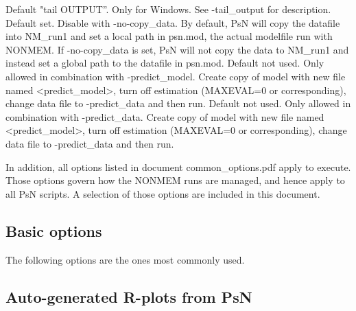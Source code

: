 \begin{optionlist}
\nextopt
{}
Default "tail OUTPUT”. Only for Windows. See -tail\_output for description.
\nextopt
{}
Default set. Disable with -no-copy\_data. By default, PsN will copy the datafile into NM\_run1 and set a local path in psn.mod, the actual modelfile run with NONMEM. If -no-copy\_data is set, PsN will not copy the data to NM\_run1 and instead set a global path to the datafile in psn.mod.
\nextopt
{}
Default not used. 
Only allowed in combination with -predict\_model.
Create copy of model with new file named <predict\_model>, turn off estimation 
(MAXEVAL=0 or corresponding), change data file to -predict\_data and then run.
Default not used. 
Only allowed in combination with -predict\_data.
Create copy of model with new file named <predict\_model>, turn off estimation 
(MAXEVAL=0 or corresponding), change data file to -predict\_data and then run.
\nextopt
\end{optionlist}

In addition, all options listed in document common\_options.pdf apply to 
execute. 
Those options govern how the NONMEM runs are managed, and hence apply to all PsN scripts. A selection of those options are included in this document.

\subsection{Basic options}
The following options are the ones most commonly used.


\subsection{Auto-generated R-plots from PsN}
\newcommand{\rplotsconditions}{The default execute template 
requires the xpose4 R library. It also relies on Xpose-type tables being 
created, such as sdtab, patab and cotab, with the correct run number. 
See the Xpose documentation for requirements on such table files.
If option -subset\_variable\_rplots is used, 
the user must ensure that the subset variable
is printed to one of the xpose tables, for example sdtab, and then
there will be separate plots created for
subsets of the data, via xpose options 'subset' and 'by'. 
If the conditions are not fulfilled then no pdf will be generated,
see the .Rout file in the main run directory for error messages.}


